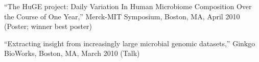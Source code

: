 \documentclass[overlapped,line,11pt]{res}
\newenvironment{list2}{
  \begin{list}{$\bullet$}{%
      \setlength{\itemsep}{0in}
      \setlength{\parsep}{0in} \setlength{\parskip}{0in}
      \setlength{\topsep}{0in} \setlength{\partopsep}{0in} 
      \setlength{\leftmargin}{0.2in}}}{\end{list}}
\begin{document}
\begin{resume}
\begin{revnumerate}[19]
\item {``The HuGE project: Daily Variation In Human Microbiome
Composition Over the Course of One Year,'' Merck-MIT Symposium,
Boston, MA, April 2010 (Poster; winner best poster)}
\vspace*{1mm}


\item {``Extracting insight from increasingly large microbial genomic
  datasets,'' Ginkgo BioWorks, Boston, MA, March 2010 (Talk)}
\vspace*{1mm}

\end{revnumerate}




\end{resume}
\end{document}
